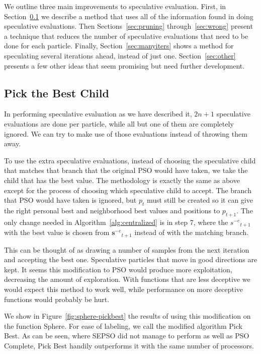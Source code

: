 \documentclass[journal,letterpaper]{IEEEtran}
\renewcommand{\sec}[1]{Section~\ref{sec:#1}}
\newcommand{\fig}[1]{Figure~\ref{fig:#1}}
\newcommand{\alg}[1]{Algorithm~\ref{alg:#1}}
\providecommand{\noeval}[1]{\ensuremath{#1^{-e}}}
\providecommand{\p}{\ensuremath{p}}
\providecommand{\s}{\ensuremath{s}}
\providecommand{\sset}{\ensuremath{\mathbf{s}}}
\begin{document}
We outline three main improvements to speculative evaluation.  First, in
\sec{pickbest} we describe a method that uses all of the information found in
doing speculative evaluations.  Then Sections~\ref{sec:pruning}
through~\ref{sec:wrong} present a technique that reduces the number of
speculative evaluations that need to be done for each particle.  Finally,
\sec{manyiters} shows a method for speculating several iterations ahead,
instead of just one.  \sec{other} presents a few other ideas that seem
promising but need further development.

\subsection{Pick the Best Child}
\label{sec:pickbest}

In performing speculative evaluation as we have described it, $2n+1$
speculative evaluations are done per particle, while all but one of them are
completely ignored.  We can try to make use of those evaluations instead of
throwing them away.  

To use the extra speculative evaluations, instead of choosing the speculative
child that matches that branch that the original PSO would have taken, we take
the child that has the best value.  The methodology is exactly the same as
above except for the process of choosing which speculative child to accept.
The branch that PSO would have taken is ignored, but $\p_t$ must still be
created so it can give the right personal best and neighborhood best values and
positions to $\p_{t+1}$.  The only change needed in \alg{centralized} is in
step 7, where the $\noeval{\s}_{t+1}$ with the best value is chosen from
$\noeval{\sset}_{t+1}$ instead of with the matching branch.

This can be thought of as drawing a number of samples from the next iteration
and accepting the best one.  Speculative particles that move in good directions
are kept.  It seems this modification to PSO would produce more exploitation,
decreasing the amount of exploration.  With functions that are less deceptive
we would expect this method to work well, while performance on more deceptive
functions would probably be hurt.

We show in \fig{sphere-pickbest} the results of using this modification on the
function Sphere.  For ease of labeling, we call the modified algorithm Pick
Best.  As can be seen, where SEPSO did not manage to perform as well as PSO
Complete, Pick Best handily outperforms it with the same number of processors.
\end{document}
